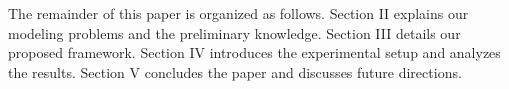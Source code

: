 The remainder of this paper is organized as follows. Section II explains our modeling problems and the preliminary knowledge. Section III details our proposed framework. Section IV introduces the experimental setup and analyzes the results. Section V concludes the paper and discusses future directions.